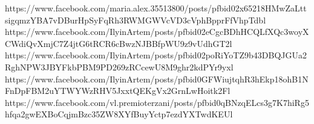  
 
 
 
 

https://www.facebook.com/maria.alex.35513800/posts/pfbid02x65218HMwZaLttsigqmzYBA7vDBurHpSyFqRh3RWMGWVcVD3cVphBpprFfVhpTdbl
https://www.facebook.com/IlyinArtem/posts/pfbid02eCgcBDhHCQLfXQc3woyXCWdiQvXmjC7Z4jtG6tRCR6cBwzNJBBfpWU9z9vUdhGT2l
https://www.facebook.com/IlyinArtem/posts/pfbid02poRiYoTZ9b43DBQJGUa2RghNPW3JBYFkbPBM9PD269zRCcewU8M9ghr2kdPYr9yxl
https://www.facebook.com/IlyinArtem/posts/pfbid0GFWiujtqhR3hEkp18ohB1NFnDpFBM2uYTWYWzRHV5JxxtQEKgVx2GrnLwHoitk2Fl
https://www.facebook.com/vl.premioterzani/posts/pfbid0qBNzqELcs3g7K7hiRg5hfqa2gwEXBoCqjmBzc35ZW8XYfBuyYctp7ezdYXTwdKEUl
